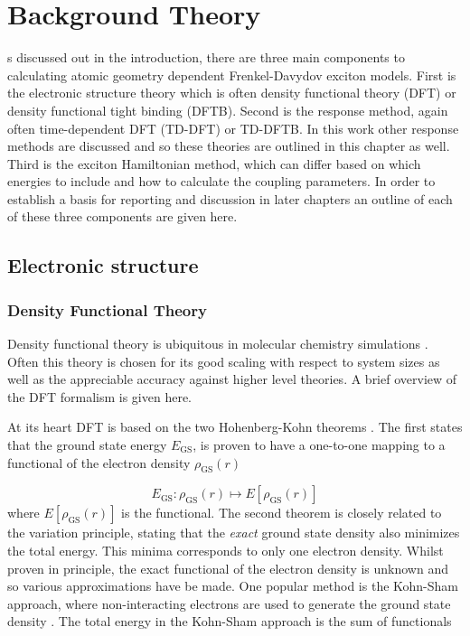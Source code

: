 %
%
\let\textcircled=\pgftextcircled
\chapter{Background Theory}
\label{chap:background_theory}

s discussed out in the introduction, there are three main components 
to calculating atomic geometry dependent Frenkel-Davydov exciton models. First is
the electronic structure theory which is often density functional theory (DFT) or
density functional tight binding (DFTB). Second is the response method, again often 
time-dependent DFT (TD-DFT) or TD-DFTB. In this work other response methods are 
discussed and so these theories are outlined in this chapter as well. Third is the
exciton Hamiltonian method, which can differ based on which energies to include
and how to calculate the coupling parameters. In order to establish a basis for 
reporting and discussion in later chapters an outline of each of these three components
are given here.

\section{Electronic structure}
\label{sec:electronic_structure}

\subsection{Density Functional Theory}
\label{subsec:dft}

Density functional theory is ubiquitous in molecular chemistry simulations \cite{Maitra2016}.
Often this theory is chosen for its good scaling with respect to system sizes as 
well as the appreciable accuracy against higher level theories. A brief overview
of the DFT formalism is given here.

At its heart DFT is based on the two Hohenberg-Kohn theorems \cite{Kohn1964}. The
first states that the ground state energy $E_{\text{GS}}$, is proven to have a one-to-one
mapping to a functional of the electron density $\rho_{\text{GS}} \left(r\right)$

\begin{equation}
    E_{\text{GS}} : \rho_{\text{GS}} \left(r\right) \mapsto E \left[ \rho_{\text{GS}} \left(r\right)\right]
\end{equation}
%
where $E \left[ \rho_{\text{GS}} \left(r\right)\right]$ is the functional. The second
theorem is closely related to the variation principle, stating that the \emph{exact}
ground state density also minimizes the total energy. This minima corresponds to 
only one electron density. Whilst proven in principle, the exact functional of the
electron density is unknown and so various approximations have be made. One popular
method is the Kohn-Sham approach, where non-interacting electrons are used to generate
the ground state density \cite{Kohn1965}. The total energy in the Kohn-Sham approach
is the sum of functionals

